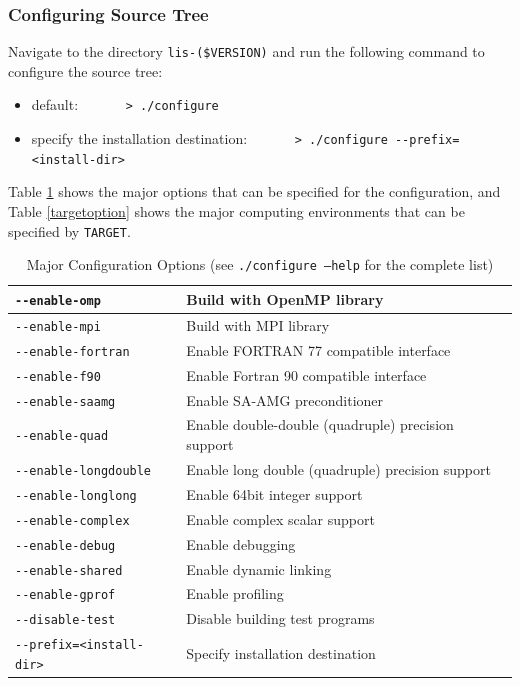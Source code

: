 \documentclass[a4paper]{article}
\begin{document}
\subsubsection{Configuring Source Tree}
 Navigate to the directory {\tt lis-(\$VERSION)} and run the following command to configure the source tree:
 \begin{itemize}
\item default: \verb&      > ./configure&
\item specify the installation destination: \verb&      > ./configure --prefix=<install-dir>&
\end{itemize}
Table \ref{configoption} shows the major options that can be specified for
the configuration, and 
Table \ref{targetoption} shows the major computing environments that can be specified 
by \verb+TARGET+. 
\begin{table}[htbp]
\caption{Major Configuration Options (see {\tt ./configure --help} for
 the complete list)}
\label{configoption}
\begin{center}
\begin{tabular}{|l|l|}
\hline
\verb+--enable-omp+      & Build with OpenMP library\\ \hline
\verb+--enable-mpi+      & Build with MPI library\\ \hline
\verb+--enable-fortran+  & Enable FORTRAN 77 compatible interface\\ \hline
\verb+--enable-f90+      & Enable Fortran 90 compatible interface\\ \hline
\verb+--enable-saamg+    & Enable SA-AMG preconditioner\\ \hline
\verb+--enable-quad+     & Enable double-double (quadruple)
 precision support\\ \hline
\verb+--enable-longdouble+ & Enable long double (quadruple)
 precision support\\ \hline
\verb+--enable-longlong+ & Enable 64bit integer support\\ \hline
\verb+--enable-complex+  & Enable complex scalar support\\ \hline 
\verb+--enable-debug+    & Enable debugging\\ \hline
\verb+--enable-shared+   & Enable dynamic linking\\ \hline
\verb+--enable-gprof+    & Enable profiling\\ \hline
\verb+--disable-test+    & Disable building test programs\\ \hline  
\verb+--prefix=<install-dir>+    & Specify installation destination\\ \hline

\end{tabular}
\end{center}
\end{table}
\end{document}
